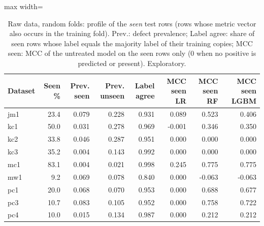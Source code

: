 \begin{table}[t]
\centering
\footnotesize
\caption{Raw data, random folds: profile of the \emph{seen} test rows (rows whose metric vector also occurs in the training fold). Prev.: defect prevalence; Label agree: share of seen rows whose label equals the majority label of their training copies; MCC seen: MCC of the untreated model on the seen rows only (0 when no positive is predicted or present). Exploratory.}
\label{tab:seen}
\begin{adjustbox}{max width=\linewidth}
\begin{tabular}{lrrrrrrr}
\toprule
Dataset & Seen \% & Prev. seen & Prev. unseen & Label agree & MCC seen LR & MCC seen RF & MCC seen LGBM \\
\midrule
jm1 & 23.4 & 0.079 & 0.228 & 0.931 & 0.089 & 0.523 & 0.406 \\
kc1 & 50.0 & 0.031 & 0.278 & 0.969 & -0.001 & 0.346 & 0.350 \\
kc2 & 33.8 & 0.046 & 0.287 & 0.951 & 0.000 & 0.000 & 0.000 \\
kc3 & 35.2 & 0.004 & 0.143 & 0.992 & 0.000 & 0.000 & 0.000 \\
mc1 & 83.1 & 0.004 & 0.021 & 0.998 & 0.245 & 0.775 & 0.775 \\
mw1 & 9.2 & 0.069 & 0.078 & 0.840 & 0.000 & -0.063 & -0.063 \\
pc1 & 20.0 & 0.068 & 0.070 & 0.953 & 0.000 & 0.688 & 0.677 \\
pc3 & 10.7 & 0.083 & 0.105 & 0.952 & 0.000 & 0.758 & 0.722 \\
pc4 & 10.0 & 0.015 & 0.134 & 0.987 & 0.000 & 0.212 & 0.212 \\
\bottomrule
\end{tabular}
\end{adjustbox}
\end{table}

